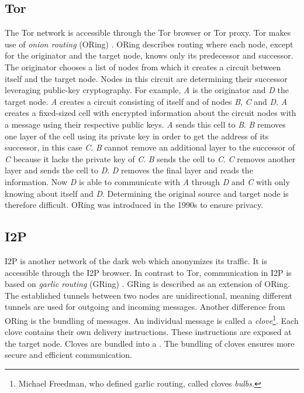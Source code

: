 \subsection{Tor} \label{tor}
The Tor network \cite{torIntro} is accessible through the Tor browser or Tor proxy. Tor makes use of \textit{onion routing} (ORing) \cite{onionRouting}. ORing describes routing where each node, except for the originator and the target node, knows only its predecessor and successor. The originator chooses a list of nodes from which it creates a circuit between itself and the target node. Nodes in this circuit are determining their successor leveraging public-key cryptography. For example, \textit{A} is the originator and \textit{D} the target node. \textit{A} creates a circuit consisting of itself and of nodes \textit{B}, \textit{C} and \textit{D}. \textit{A} creates a fixed-sized cell with encrypted information about the circuit nodes with a message using their respective public keys. \textit{A} sends this cell to \textit{B}. \textit{B} removes one layer of the cell using its private key in order to get the address of its successor, in this case \textit{C}. \textit{B} cannot remove an additional layer to the successor of \textit{C} because it lacks the private key of \textit{C}. \textit{B} sends the cell to \textit{C}. \textit{C} removes another layer and sends the cell to \textit{D}. \textit{D} removes the final layer and reads the information. Now \textit{D} is able to communicate with \textit{A} through \textit{D} and \textit{C} with only knowing about itself and \textit{D}. Determining the original source and target node is therefore difficult. ORing was introduced in the 1990s to ensure privacy. 

\subsection{I2P} \label{I2P}
I2P \cite{i2pIntro} is another network of the dark web which anonymizes its traffic. It is accessible through the I2P browser. In contrast to Tor, communication in I2P is based on \textit{garlic routing} (GRing) \cite{garlicRouting}. GRing is described as an extension of ORing. The established tunnels between two nodes are unidirectional, meaning different tunnels are used for outgoing and incoming messages. Another difference from ORing is the bundling of messages. An individual message is called a \textit{clove}\footnote{Michael Freedman, who defined garlic routing, called cloves \textit{bulbs}.}. Each clove contains their own delivery instructions. These instructions are exposed at the target node. Cloves are bundled into a . The bundling of cloves ensures more secure and efficient communication. 

